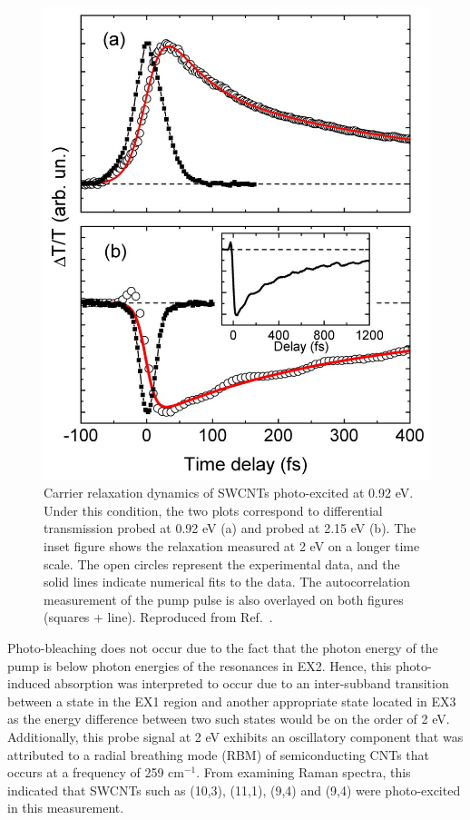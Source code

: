 \begin{figure}[H]
	\centering
	\includegraphics[scale=0.25]{images/chapter_prior_works/e11_pump_probe_manzoni}
	\caption{Carrier relaxation dynamics of SWCNTs photo-excited at 0.92 eV. Under this condition, the two plots correspond to differential transmission probed at 0.92 eV (a) and probed at 2.15 eV (b). The inset figure shows the relaxation measured at 2 eV on a longer time scale. The open circles represent the experimental data, and the solid lines indicate numerical fits to the data. The autocorrelation measurement of the pump pulse is also overlayed on both figures (squares + line). Reproduced from Ref.\ \cite{manzoni2005intersubband}.}
	\label{fig:e11_pump_manzoni}
\end{figure}

Photo-bleaching does not occur due to the fact that the photon energy of the pump is below photon energies of the resonances in EX2. Hence, this photo-induced absorption was interpreted to occur due to an inter-subband transition between a state in the EX1 region and another appropriate state located in EX3 as the energy difference between two such states would be on the order of 2 eV. Additionally, this probe signal at 2 eV exhibits an oscillatory component that was attributed to a radial breathing mode (RBM) of semiconducting CNTs that occurs at a frequency of 259 $\text{cm}^{-1}$. From examining Raman spectra, this indicated that SWCNTs such as (10,3), (11,1), (9,4) and (9,4) were photo-excited in this measurement.


